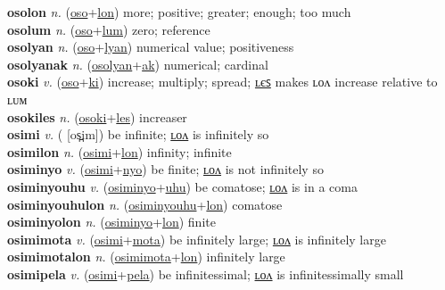 \textbf{osolon} \textit{n.} (\hyperref[oso]{oso}+\hyperref[lon]{lon})
more; positive; greater; enough; too much \label{osolon} \\
\textbf{osolum} \textit{n.} (\hyperref[oso]{oso}+\hyperref[lum]{lum})
zero; reference \label{osolum} \\
\textbf{osolyan} \textit{n.} (\hyperref[oso]{oso}+\hyperref[lyan]{lyan})
numerical value; positiveness \label{osolyan} \\
\textbf{osolyanak} \textit{n.} (\hyperref[osolyan]{osolyan}+\hyperref[ak]{ak})
numerical; cardinal \label{osolyanak} \\
\textbf{osoki} \textit{v.} (\hyperref[oso]{oso}+\hyperref[ki]{ki})
increase; multiply; spread; \hyperref[osokiles]{ʟєꜱ} makes ʟᴏᴧ increase relative to ʟᴜᴍ \label{osoki} \\
\textbf{osokiles} \textit{n.} (\hyperref[osoki]{osoki}+\hyperref[les]{les})
increaser \label{osokiles} \\
\textbf{osimi} \textit{v.} ( [os̪im])
be infinite; \hyperref[osimilon]{ʟᴏᴧ} is infinitely so \label{osimi} \\
\textbf{osimilon} \textit{n.} (\hyperref[osimi]{osimi}+\hyperref[lon]{lon})
infinity; infinite \label{osimilon} \\
\textbf{osiminyo} \textit{v.} (\hyperref[osimi]{osimi}+\hyperref[nyo]{nyo})
be finite; \hyperref[osiminyolon]{ʟᴏᴧ} is not infinitely so \label{osiminyo} \\
\textbf{osiminyouhu} \textit{v.} (\hyperref[osiminyo]{osiminyo}+\hyperref[uhu]{uhu})
be comatose; \hyperref[osiminyouhulon]{ʟᴏᴧ} is in a coma \label{osiminyouhu} \\
\textbf{osiminyouhulon} \textit{n.} (\hyperref[osiminyouhu]{osiminyouhu}+\hyperref[lon]{lon})
comatose \label{osiminyouhulon} \\
\textbf{osiminyolon} \textit{n.} (\hyperref[osiminyo]{osiminyo}+\hyperref[lon]{lon})
finite \label{osiminyolon} \\
\textbf{osimimota} \textit{v.} (\hyperref[osimi]{osimi}+\hyperref[mota]{mota})
be infinitely large; \hyperref[osimimotalon]{ʟᴏᴧ} is infinitely large \label{osimimota} \\
\textbf{osimimotalon} \textit{n.} (\hyperref[osimimota]{osimimota}+\hyperref[lon]{lon})
infinitely large \label{osimimotalon} \\
\textbf{osimipela} \textit{v.} (\hyperref[osimi]{osimi}+\hyperref[pela]{pela})
be infinitessimal; \hyperref[osimipelalon]{ʟᴏᴧ} is infinitessimally small \label{osimipela} \\
